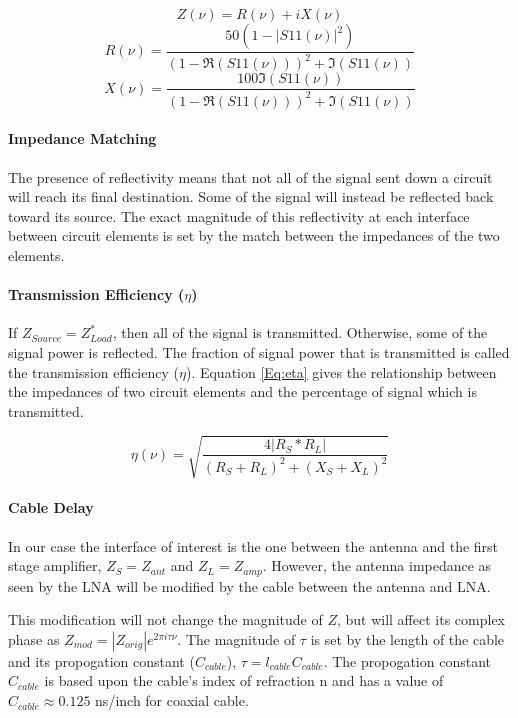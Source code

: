\begin{equation}\label{Eq:Imp_calc}
Z(\nu) = R(\nu)+ i X(\nu) 
\end{equation}
\begin{equation}
R(\nu) = \frac{50 (1-|S11(\nu)|^2)}{(1-\Re(S11(\nu)))^2 + \Im(S11(\nu))} 
\end{equation}
\begin{equation}
X(\nu) = \frac{100 \Im(S11(\nu))}{(1-\Re(S11(\nu)))^2 + \Im(S11(\nu))} 
\end{equation}

\paragraph{Impedance Matching}

The presence of reflectivity means that not all of the signal sent down a circuit will reach its final destination. Some of the signal will instead be reflected back toward its source. The exact magnitude of this reflectivity at each interface between circuit elements is set by the match between the impedances of the two elements. 

\paragraph{Transmission Efficiency ($\eta$)}

If $Z_{Source} = Z^*_{Load}$, then all of the signal is transmitted. Otherwise, some of the signal power is reflected. The fraction of signal power that is transmitted is called the transmission efficiency ($\eta$). Equation \ref{Eq:eta} gives the relationship between the impedances of two circuit elements and the percentage of signal which is transmitted. 

\begin{equation} \label{Eq:eta}
\eta (\nu) = \sqrt{\frac{4 |R_{S}*R_{L}|}{(R_{S}+R_{L})^2+(X_{S}+X_{L})^2}}
\end{equation}

\paragraph{Cable Delay}

In our case the interface of interest is the one between the antenna and the first stage amplifier, $Z_S = Z_{ant}$ and $Z_L = Z_{amp}$. However, the antenna impedance as seen by the LNA will be modified by the cable between the antenna and LNA. 

This modification will not change the magnitude of $Z$, but will affect its complex phase as $Z_{mod} = |Z_{orig}| e^{2 \pi i \tau \nu }$. The magnitude of $\tau$ is set by the length of the cable and its propogation constant ($C_{cable}$), $\tau = l_{cable} C_{cable}$. The propogation constant $C_{cable}$ is based upon the cable's index of refraction n and has a value of $C_{cable} \approx 0.125$ ns/inch for coaxial cable. 

